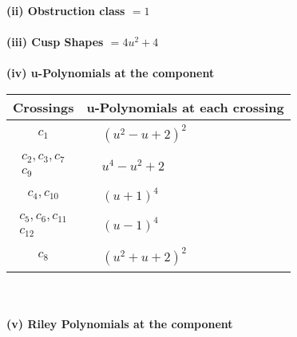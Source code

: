 \documentclass[1p]{elsarticle_modified}
\theoremstyle{definition}
\begin{document}
\flushleft \textbf{(ii) Obstruction class $= 1$}\\~\\
\flushleft \textbf{(iii) Cusp Shapes $= 4 u^2+4$}\\~\\
\newpage\renewcommand{\arraystretch}{1}
\flushleft \textbf{(iv) u-Polynomials at the component}\newline \\
\begin{tabular}{m{50pt}|m{274pt}}
Crossings & \hspace{64pt}u-Polynomials at each crossing \\
\hline $$\begin{aligned}c_{1}\end{aligned}$$&$\begin{aligned}
&(u^2- u+2)^2
\end{aligned}$\\
\hline $$\begin{aligned}c_{2},c_{3},c_{7}\\c_{9}\end{aligned}$$&$\begin{aligned}
&u^4- u^2+2
\end{aligned}$\\
\hline $$\begin{aligned}c_{4},c_{10}\end{aligned}$$&$\begin{aligned}
&(u+1)^4
\end{aligned}$\\
\hline $$\begin{aligned}c_{5},c_{6},c_{11}\\c_{12}\end{aligned}$$&$\begin{aligned}
&(u-1)^4
\end{aligned}$\\
\hline $$\begin{aligned}c_{8}\end{aligned}$$&$\begin{aligned}
&(u^2+u+2)^2
\end{aligned}$\\
\hline
\end{tabular}\\~\\
\newpage\renewcommand{\arraystretch}{1}
\flushleft \textbf{(v) Riley Polynomials at the component}\newline \\
\end{document}
